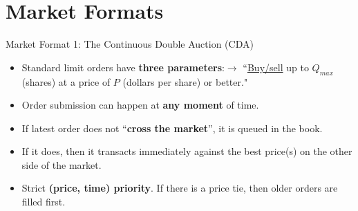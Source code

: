 \documentclass[10pt]{beamer}
\begin{document}
\section{Market Formats}
\begin{frame}{Market Format 1: The Continuous Double Auction (CDA)}
    \begin{itemize}
        \item Standard limit orders have \textbf{three parameters}:$\rightarrow$ ``\underline{Buy/sell} up to \underline{$Q_{max}$} (shares) at a price of \underline{$P$} (dollars per share) or better."
        \item Order submission can happen at \textbf{any moment} of time. 
        \item If latest order does not ``\textbf{cross the market}'', it is queued in the book. 
        \item If it does, then it transacts immediately against the best price(s) on the other side of the market.
        \item Strict \textbf{(price, time) priority}. If there is a price tie, then older orders are filled first.
    \end{itemize} 
\end{frame}


\end{document}

